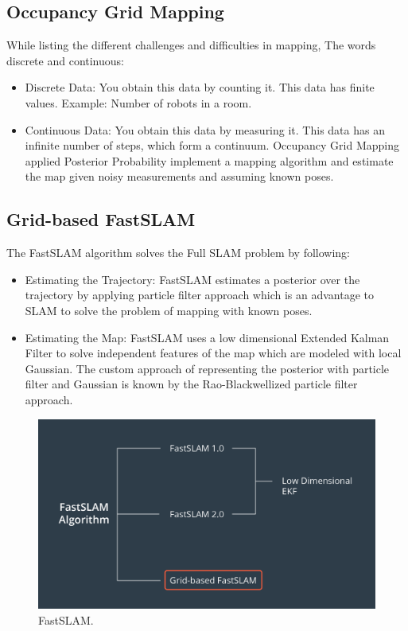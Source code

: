 \documentclass[10pt,journal,compsoc]{IEEEtran}
\begin{document}
\subsection{Occupancy Grid Mapping}
While listing the different challenges and difficulties in mapping, The words discrete and continuous:
\begin{itemize}
\item Discrete Data: You obtain this data by counting it. This data has finite values. Example: Number of robots in a room.

\item Continuous Data: You obtain this data by measuring it. This data has an infinite number of steps, which form a continuum. Occupancy Grid Mapping applied Posterior Probability implement a mapping algorithm and estimate the map given noisy measurements and assuming known poses.
\end {itemize}
\subsection{Grid-based FastSLAM}
The FastSLAM algorithm solves the Full SLAM problem by following:
\begin{itemize}
\item Estimating the Trajectory: FastSLAM estimates a posterior over the trajectory by applying particle filter approach which is an advantage to SLAM to solve the problem of mapping with known poses.
\item Estimating the Map: FastSLAM uses a low dimensional Extended Kalman Filter to solve independent features of the map which are modeled with local Gaussian. The custom approach of representing the posterior with particle filter and Gaussian is known by the Rao-Blackwellized particle filter approach.
\end {itemize}
\begin{figure}[thpb]
      \centering
      \includegraphics[width=\linewidth]{FastSLAM.png}
      \caption{FastSLAM.}
      \label{fig:robot1}
\end{figure}
\end{document}
